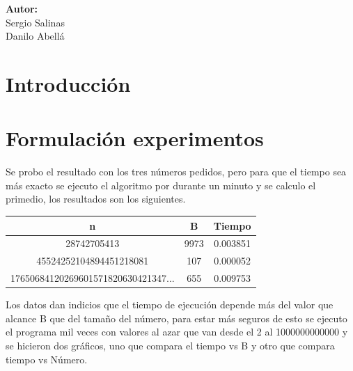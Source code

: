 \documentclass[12pt,letterpaper]{scrartcl}
\begin{document}
\begin{titlepage}
\begin{center}
\begin{minipage}[l]{0.4\textwidth}
	\begin{flushright}

		\textbf{\textsf{Autor:}}\\
		\linespread{1}
		\large Sergio Salinas\\
		\large Danilo Abellá\\

	\end{flushright}
\end{minipage}

\end{center}

\end{titlepage}



\newpage

\tableofcontents

\newpage
\section{Introducción}

\newpage
\section{Formulación experimentos}

Se probo el resultado con los tres números pedidos, pero para que el tiempo sea más exacto se ejecuto el algoritmo por durante un minuto y se calculo el primedio, los resultados son los siguientes.\\
	
\begin{center}
\begin{tabular}{|c|c|c|}
\hline 
n & B & Tiempo \\ 
\hline 
28742705413 & 9973 & 0.003851 \\ 
\hline 
45524252104894451218081 & 107 & 0.000052 \\ 
\hline 
17650684120269601571820630421347...
 & 655 & 0.009753 \\ 
\hline 
\end{tabular} 
\end{center}

Los datos dan indicios que el tiempo de ejecución depende más del valor que alcance B que del tamaño del número, para estar más seguros de esto se ejecuto el programa mil veces con valores al azar que van desde el 2 al 1000000000000 y se hicieron dos gráficos, uno que compara el tiempo vs B y otro que compara tiempo vs Número.
\end{document}
